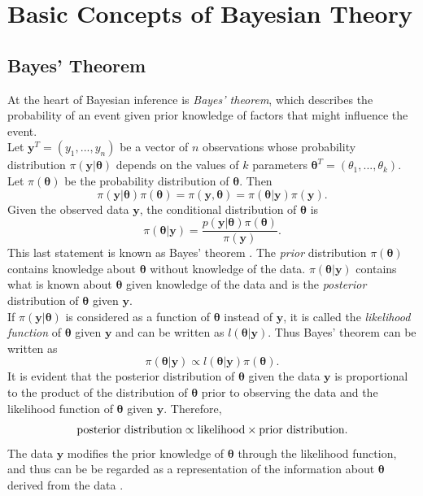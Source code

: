 \section{Basic Concepts of Bayesian Theory}
\subsection{Bayes' Theorem}
At the heart of Bayesian inference is \textit{Bayes' theorem}, which describes the probability of an event given prior knowledge of factors that might influence the event. \\
Let $\pmb{y}^T=\left(y_1,...,y_n\right)$ be a vector of $n$ observations whose probability distribution $\pi\left(\pmb{y}|\pmb{\theta}\right)$ depends on the values of $k$ parameters $\pmb{\theta}^T=\left(\theta_1,...,\theta_k\right)$. Let $\pi\left(\pmb{\theta}\right)$ be the probability distribution of $\pmb{\pmb{\theta}}$. Then 
\begin{equation}
    \pi\left(\pmb{y}|\pmb{\theta}\right)\pi\left(\pmb{\theta}\right)=\pi\left(\pmb{y},\pmb{\theta}\right) = \pi\left(\pmb{\theta}|\pmb{y}\right)\pi\left(\pmb{y}\right).
\end{equation}
Given the observed data $\pmb{y}$, the conditional distribution of $\pmb{\theta}$ is
\begin{equation}
    \pi\left(\pmb{\theta}|\pmb{y}\right)=\frac{p\left(\pmb{y}|\pmb{\theta}\right)\pi\left(\pmb{\theta}\right)}{\pi\left(\pmb{y}\right)}.
\end{equation}
This last statement is known as Bayes' theorem \autocite[][]{bayes1763lii}. The \textit{prior} distribution $\pi\left(\pmb{\theta}\right)$ contains knowledge about $\pmb{\theta}$ without knowledge of the data. $\pi\left(\pmb{\theta}|\pmb{y}\right)$ contains what is known about $\pmb{\theta}$ given knowledge of the data and is the \textit{posterior} distribution of $\pmb{\theta}$ given $\pmb{y}$. \\
If $\pi\left(\pmb{y}|\pmb{\theta}\right)$ is considered as a function of $\pmb{\theta}$ instead of $\pmb{y}$, it is called the \textit{likelihood function} of $\pmb{\theta}$ given $\pmb{y}$ and can be written as $l\left(\pmb{\theta}|\pmb{y}\right)$. Thus Bayes' theorem can be written as
\begin{equation}
    \pi\left(\pmb{\theta}|\pmb{y}\right)\propto l\left(\pmb{\theta}|\pmb{y}\right)\pi\left(\pmb{\theta}\right).
\end{equation}
It is evident that the posterior distribution of $\pmb{\theta}$ given the data $\pmb{y}$ is proportional to the product of the distribution of $\pmb{\theta}$ prior to observing the data and the likelihood function of $\pmb{\theta}$ given $\pmb{y}$. Therefore,
\begin{equation*}
    \hbox{posterior distribution} \propto  \hbox{likelihood}\times\hbox{prior distribution}.
\end{equation*}
The data $\pmb{y}$ modifies the prior knowledge of $\pmb{\theta}$ through the likelihood function, and thus can be be regarded as a representation of the information about  $\pmb{\theta}$ derived from the data \autocite[][]{box2011bayesian}.
